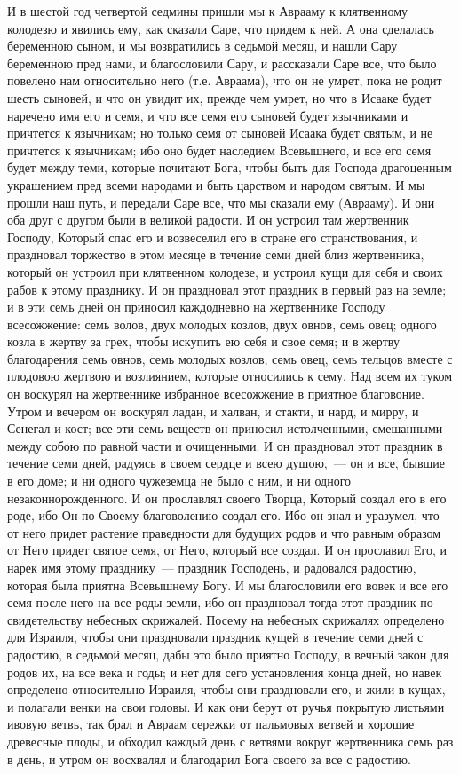 И в шестой год четвертой седмины пришли мы к
Аврааму к клятвенному колодезю и явились ему, как
сказали Саре, что придем к ней. А она сделалась
беременною сыном, и мы возвратились в седьмой
месяц, и нашли Сару беременною пред нами, и
благословили Сару, и рассказали Саре все, что
было повелено нам относительно него (т.е.
Авраама), что он не умрет, пока не родит шесть
сыновей, и что он увидит их, прежде чем умрет, но
что в Исааке будет наречено имя его и семя, и что
все семя его сыновей будет язычниками и
причтется к язычникам; но только семя от сыновей
Исаака будет святым, и не причтется к язычникам;
ибо оно будет наследием Всевышнего, и все его
семя будет между теми, которые почитают Бога,
чтобы быть для Господа драгоценным украшением
пред всеми народами и быть царством и народом
святым. И мы прошли наш путь, и передали Саре все,
что мы сказали ему (Аврааму). И они оба друг с
другом были в великой радости. И он устроил там
жертвенник Господу, Который спас его и
возвеселил его в стране его странствования, и
праздновал торжество в этом месяце в течение
семи дней близ жертвенника, который он устроил
при клятвенном колодезе, и устроил кущи для себя
и своих рабов к этому празднику. И он праздновал этот
праздник в первый раз на земле; и в эти семь
дней он приносил каждодневно на жертвеннике
Господу всесожжение: семь волов, двух молодых
козлов, двух овнов, семь овец; одного козла в
жертву за грех, чтобы искупить ею себя и свое
семя; и в жертву благодарения семь овнов, семь
молодых козлов, семь овец, семь тельцов вместе с
плодовою жертвою и возлиянием, которые
относились к сему. Над всем их туком он воскурял
на жертвеннике избранное всесожжение в приятное
благовоние. Утром и вечером он воскурял ладан, и
халван, и стакти, и нард, и мирру, и Сенегал и кост;
все эти семь веществ он приносил
истолченными, смешанными между собою по равной
части и очищенными. И он праздновал этот праздник
в течение семи дней, радуясь в своем сердце и всею
душою,~--- он и все, бывшие в его доме; и ни одного
чужеземца не было с ним, и ни одного
незаконнорожденного. И он прославлял своего
Творца, Который создал его в его роде, ибо Он по
Своему благоволению создал его. Ибо он знал и
уразумел, что от него придет растение
праведности для будущих родов и что равным
образом от Него придет святое семя, от Него,
который все создал. И он прославил Его, и нарек
имя этому празднику~--- праздник Господень, и
радовался радостию, которая была приятна
Всевышнему Богу. И мы благословили его вовек и
все его семя после него на все роды земли, ибо он
праздновал тогда этот праздник по свидетельству
небесных скрижалей. Посему на небесных скрижалях
определено для Израиля, чтобы они праздновали
праздник кущей в течение семи дней с радостию, в
седьмой месяц, дабы это было приятно Господу, в
вечный закон для родов их, на все века и годы; и
нет для сего установления конца дней, но
навек определено относительно Израиля, чтобы они
праздновали его, и жили в кущах, и полагали венки
на свои головы. И как они берут от ручья покрытую
листьями ивовую ветвь, так брал и Авраам сережки
от пальмовых ветвей и хорошие древесные плоды, и
обходил каждый день с ветвями вокруг жертвенника
семь раз в день, и утром он восхвалял и благодарил
Бога своего за все с радостию.

